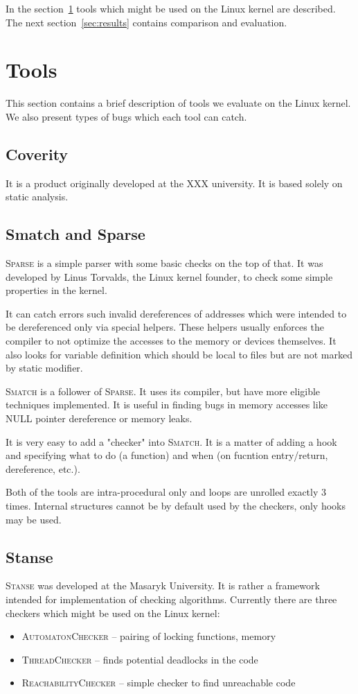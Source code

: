 \documentclass[10pt]{llncs}
\newcommand\Color[2]{\textcolor{#1}{#2}}
\newcommand{\nb}[1]{\marginpar{\scriptsize #1}}
\renewcommand\note[1]{\nb{\Color{blue}{#1}}}
\newcommand{\SM}{\textsc{Smatch}\xspace}
\newcommand{\SP}{\textsc{Sparse}\xspace}
\newcommand{\ST}{\textsc{Stanse}\xspace}
\begin{document}
In the section~\ref{sec:tools} tools which might be used on the Linux kernel
are described. The next section~\ref{sec:results} contains comparison and
evaluation.

\section{Tools}
\label{sec:tools}

This section contains a brief description of tools we evaluate on the Linux
kernel. We also present types of bugs which each tool can catch.

\subsection{Coverity}
It is a product originally developed at the XXX university. It is based solely
on static analysis.

\subsection{Smatch and Sparse}
\SP is a simple parser with some basic checks on the top of that.  It was
developed by Linus Torvalds, the Linux kernel founder, to check some simple
properties in the kernel.

It can catch errors such invalid dereferences of addresses which were intended
to be dereferenced only via special helpers. These helpers usually enforces
the compiler to not optimize the accesses to the memory or devices themselves.
It also looks for variable definition which should be local to files but are
not marked by static modifier.

\SM is a follower of \SP. It uses its compiler, but have more eligible
techniques implemented. It is useful in finding bugs in memory accesses like
NULL pointer dereference or memory leaks.

It is very easy to add a "checker" into \SM. It is a matter of adding a hook
and specifying what to do (a function) and when (on fucntion entry/return,
dereference\note{fakt?}, etc.).

Both of the tools are intra-procedural only and loops are unrolled exactly
3\note{fakt?} times. Internal structures cannot be by default used by the
checkers, only hooks may be used.

\subsection{Stanse}
\ST was developed at the Masaryk University. It is rather a framework intended
for implementation of checking algorithms. Currently there are three checkers
which might be used on the Linux kernel:
\begin{itemize}
\item \textsc{AutomatonChecker} -- pairing of locking functions, memory 
\item \textsc{ThreadChecker} -- finds potential deadlocks in the code
\item \textsc{ReachabilityChecker} -- simple checker to find unreachable code
\end{itemize}
\end{document}
